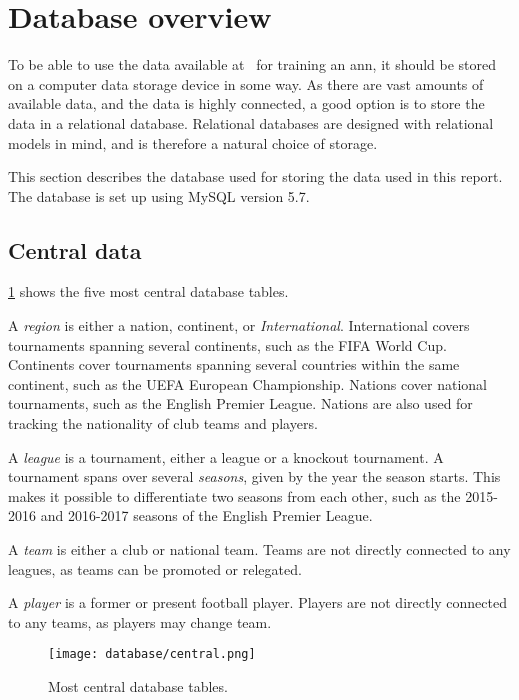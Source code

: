 \section{Database overview}
\label{sec:database-overview}

To be able to use the data available at \whoscored\ for training an \gls{ann}, it should be stored on a computer data storage device in some way. As there are vast amounts of available data, and the data is highly connected, a good option is to store the data in a relational database. Relational databases are designed with relational models in mind, and is therefore a natural choice of storage. 

This section describes the database used for storing the data used in this report. The database is set up using MySQL version 5.7.


\subsection{Central data}

\cref{fig:database-central} shows the five most central database tables.

A \textit{region} is either a nation, continent, or \textit{International}. International covers tournaments spanning several continents, such as the FIFA World Cup. Continents cover tournaments spanning several countries within the same continent, such as the UEFA European Championship. Nations cover national tournaments, such as the English Premier League. Nations are also used for tracking the nationality of club teams and players.

A \textit{league} is a tournament, either a league or a knockout tournament. A tournament spans over several \textit{seasons}, given by the year the season starts. This makes it possible to differentiate two seasons from each other, such as the 2015-2016 and 2016-2017 seasons of the English Premier League.

A \textit{team} is either a club or national team. Teams are not directly connected to any leagues, as teams can be promoted or relegated.

A \textit{player} is a former or present football player. Players are not directly connected to any teams, as players may change team.

\begin{figure}
    \centering
    \texttt{[image: database/central.png]}
    \caption{Most central database tables.}
    \label{fig:database-central}
\end{figure}


